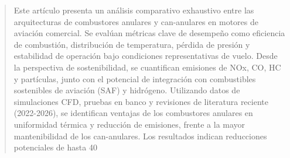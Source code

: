 \begin{abstract}
Este artículo presenta un análisis comparativo exhaustivo entre las arquitecturas de combustores anulares y can-anulares en motores de aviación comercial. Se evalúan métricas clave de desempeño como eficiencia de combustión, distribución de temperatura, pérdida de presión y estabilidad de operación bajo condiciones representativas de vuelo. Desde la perspectiva de sostenibilidad, se cuantifican emisiones de NOx, CO, HC y partículas, junto con el potencial de integración con combustibles sostenibles de aviación (SAF) y hidrógeno. Utilizando datos de simulaciones CFD, pruebas en banco y revisiones de literatura reciente (2022-2026), se identifican ventajas de los combustores anulares en uniformidad térmica y reducción de emisiones, frente a la mayor mantenibilidad de los can-anulares. Los resultados indican reducciones potenciales de hasta 40%
\end{abstract}